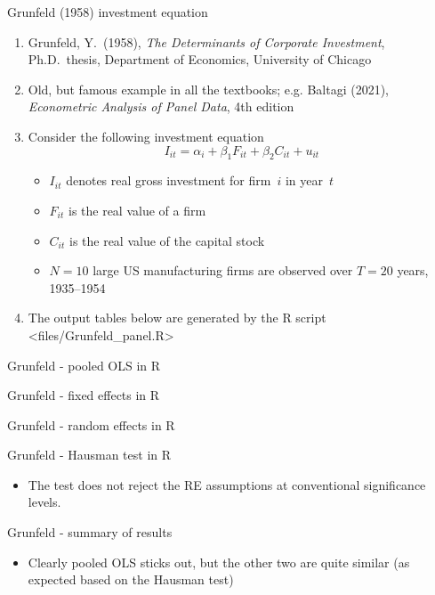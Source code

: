 \documentclass[english, professionalfonts,smaller,xcolor=dvipsnames]{beamer}
\def\\{}%
\def\texttt#1{<#1>}%
\begin{document}
\begin{frame}{Grunfeld (1958) investment equation}
\begin{enumerate}
\item[$\Rightarrow$] Grunfeld, Y.\ (1958), \emph{The Determinants of Corporate Investment}, Ph.D.\ thesis, Department of Economics, University of Chicago
\item[$\Rightarrow$] Old, but famous example in all the textbooks; e.g.\\
Baltagi (2021), \emph{Econometric Analysis of Panel Data}, 4th edition
\item[$\Rightarrow$] Consider the following investment equation
$$
I_{it} = \alpha_i + \beta_1 F_{it} + \beta_2 C_{it} + u_{it}
$$
\begin{itemize}
\item $I_{it}$ denotes real gross investment for firm~$i$ in year~$t$
\item $F_{it}$ is the real value of a firm 
\item $C_{it}$ is the real value of the capital stock
\item $N=10$ large US manufacturing firms are observed over $T=20$ years, 1935--1954
\end{itemize}
\item[$\Rightarrow$] The output tables below are generated by the R script \texttt{files/Grunfeld\_panel.R}
\end{enumerate}
\end{frame}

\begin{frame}{Grunfeld - pooled OLS in R}

\end{frame}

\begin{frame}{Grunfeld - fixed effects in R}

\end{frame}

\begin{frame}{Grunfeld - random effects in R}

\end{frame}

\begin{frame}{Grunfeld - Hausman test in R}

\begin{itemize}
\item[$\Rightarrow$] The test does not reject the RE assumptions at conventional significance levels.
\end{itemize}
\end{frame}

\begin{frame}{Grunfeld - summary of results}

\begin{itemize}
\item[$\Rightarrow$] Clearly pooled OLS sticks out, but the other two are quite similar (as expected based on the Hausman test)
\end{itemize}
\end{frame}
\end{document}
